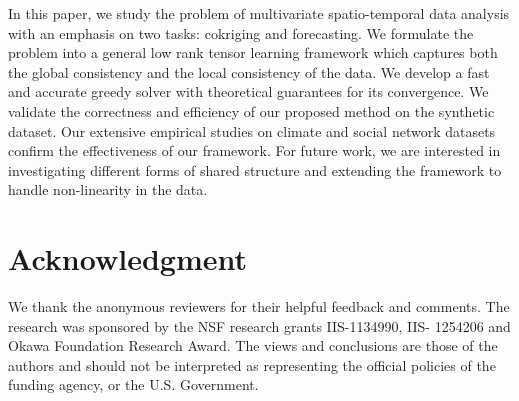 In this paper, we study the problem of multivariate spatio-temporal data analysis with an emphasis on two tasks: cokriging and forecasting.  We formulate the problem into a general low rank tensor learning framework which captures both the global consistency and the local consistency of the data. We develop a fast and accurate greedy solver with theoretical guarantees for its convergence. We validate the correctness and efficiency of our proposed method on the synthetic dataset. Our extensive empirical studies on climate and social network datasets confirm the effectiveness of our framework. For future work, we are interested in investigating different forms of shared structure and extending the framework to handle non-linearity in the data.
\vspace{-0.1in}
\section*{Acknowledgment}
We thank the anonymous reviewers for their helpful feedback and comments. The research was sponsored by the NSF research grants IIS-1134990, IIS- 1254206 and Okawa Foundation Research Award. The views and conclusions are those of the authors and should not be interpreted as representing the official policies of the funding agency, or the U.S. Government.